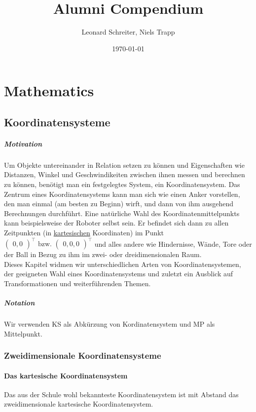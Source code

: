 \documentclass[12pt,a4paper]{report}
\title{Alumni Compendium}           %
\author{Leonard Schreiter, Niels Trapp}          %
\date{\today}           %
\begin{document}
	\maketitle

	\tableofcontents

	\chapter{Mathematics}
	 \section{Koordinatensysteme}
	  \paragraph{Motivation}

		  Um Objekte untereinander in Relation setzen zu können und Eigenschaften wie Distanzen, Winkel und Geschwindikeiten zwischen ihnen messen und berechnen zu können, benötigt man ein festgelegtes System, ein Koordinatensystem.
		  Das Zentrum eines Koordinatensystems kann man sich wie einen Anker vorstellen, den man einmal (am besten zu Beginn) wirft, und dann von ihm ausgehend Berechnungen durchführt.
		  Eine natürliche Wahl des Koordinatenmittelpunkts kann beispielsweise der Roboter selbst sein. Er befindet sich dann zu allen Zeitpunkten (in \hyperref[Mathe_KS_kartesisch]{kartesischen} Koordinaten) im Punkt
		  $\begin{pmatrix}0,0\end{pmatrix}^\top \text{ bzw. }\begin{pmatrix}0,0,0\end{pmatrix}^\top$
		  und alles andere wie Hindernisse, Wände, Tore oder der Ball in Bezug zu ihm im zwei- oder dreidimensionalen Raum. \\
		  Dieses Kapitel widmen wir unterschiedlichen Arten von Koordinatensystemen, der geeigneten Wahl eines Koordinatensystems und zuletzt ein Ausblick auf Transformationen und weiterführenden Themen.

	  \paragraph{Notation}
		  Wir verwenden KS als Abkürzung von Kordinatensystem und MP als Mittelpunkt.

	  \subsection{Zweidimensionale Koordinatensysteme}
		  \subsubsection{Das kartesische Koordinatensystem}\label{Mathe_KS_kartesisch}
			  Das aus der Schule wohl bekannteste Koordinatensystem ist mit Abstand das zweidimensionale kartesische Koordinatensystem.
\end{document}
